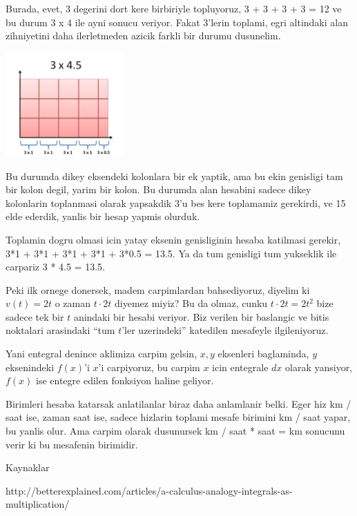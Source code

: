 \documentclass[12pt,fleqn]{article}
\begin{document}
Burada, evet, 3 degerini dort kere birbiriyle topluyoruz, 3 + 3 + 3 + 3 =
12 ve bu durum 3 x 4 ile ayni sonucu veriyor. Fakat 3'lerin toplami, egri
altindaki alan zihniyetini daha ilerletmeden azicik farkli bir durumu
dusunelim. 

\includegraphics[height=4cm]{piecewise-multiplication.png}

Bu durumda dikey eksendeki kolonlara bir ek yaptik, ama bu ekin genisligi
tam bir kolon degil, yarim bir kolon. Bu durumda alan hesabini sadece dikey
kolonlarin toplanmasi olarak yapsakdik 3'u bes kere toplamamiz gerekirdi,
ve 15 elde ederdik, yanlis bir hesap yapmis olurduk.

Toplamin dogru olmasi icin yatay eksenin genisliginin hesaba katilmasi
gerekir, 3*1 + 3*1 + 3*1 + 3*1 + 3*0.5 = 13.5. Ya da tum genisligi tum
yukseklik ile carpariz 3 * 4.5 = 13.5. 

Peki ilk ornege donersek, madem carpimlardan bahsediyoruz, diyelim ki
$v(t)
= 2t$ o zaman $t
\cdot 2t$ diyemez miyiz? Bu da olmaz, cunku $t\cdot 2t = 2t^2$ 
bize sadece tek bir $t$ anindaki bir hesabi veriyor. Biz verilen bir 
baslangic ve bitis noktalari arasindaki ``tum $t$'ler uzerindeki'' 
katedilen mesafeyle ilgileniyoruz.  

Yani entegral denince aklimiza carpim gelsin, $x,y$ eksenleri baglaminda,
$y$ eksenindeki $f(x)$'i $x$'i carpiyoruz, bu carpim $x$ icin entegrale
$dx$ olarak yansiyor, $f(x)$ ise entegre edilen fonksiyon haline geliyor. 

Birimleri hesaba katarsak anlatilanlar biraz daha anlamlanir belki. Eger
hiz km / saat ise, zaman saat ise, sadece hizlarin toplami mesafe birimini
km / saat yapar, bu yanlis olur. Ama carpim olarak dusunursek km / saat *
saat = km sonucunu verir ki bu mesafenin birimidir. 

Kaynaklar

http://betterexplained.com/articles/a-calculus-analogy-integrals-as-multiplication/
\end{document}
